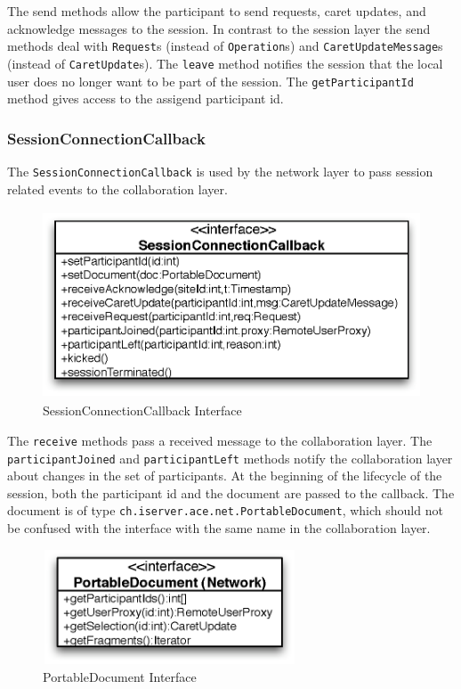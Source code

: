 The send methods allow the participant to send requests, caret updates,
and acknowledge messages to the session. In contrast to the session
layer the send methods deal with \texttt{Request}s (instead of
\texttt{Operation}s) and \texttt{CaretUpdateMessage}s (instead of
\texttt{CaretUpdate}s). The
\texttt{leave} method notifies the session that the local user does
no longer want to be part of the session. The \texttt{getParticipantId}
method gives access to the assigend participant id.


\subsubsection{SessionConnectionCallback}
The \texttt{SessionConnectionCallback} is used by the network layer
to pass session related events to the collaboration layer.

\begin{figure}[H]
 \centering
 \includegraphics[width=11.50cm,height=5.57cm]{../images/finalreport/architecture_sessionconnectioncallback_uml.eps}
 \caption{SessionConnectionCallback Interface}
\end{figure}

The \texttt{receive} methods pass a received message to the collaboration
layer. The \texttt{participantJoined} and \texttt{participantLeft} methods
notify the collaboration layer about changes in the set of participants.
At the beginning of the lifecycle of the session, both the participant
id and the document are passed to the callback. The document is of
type \texttt{ch.\-iserver.\-ace.\-net.\-PortableDocument}, which should not
be confused with the interface with the same name in the collaboration
layer.

\begin{figure}[H]
 \centering
 \includegraphics[width=7.55cm,height=3.40cm]{../images/finalreport/architecture_portabledocumentnet_uml.eps}
 \caption{PortableDocument Interface}
\end{figure}

